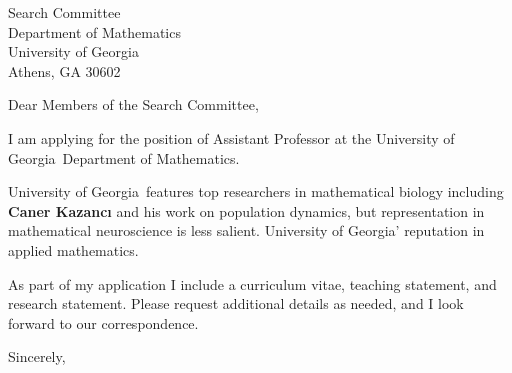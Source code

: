 \documentclass[11pt,a4paper]{letter}
\begin{document}

\def\School{University of Georgia}

\begin{letter}
{Search Committee\\
Department of Mathematics\\
University of Georgia\\
Athens, GA 30602}


\opening{Dear Members of the Search Committee,}

I am applying for the position of Assistant Professor at the \School~Department of Mathematics. 



\School~features top researchers in mathematical biology including \textbf{Caner Kazancı} and his work on population dynamics, but representation in mathematical neuroscience is less salient. \School' reputation in applied mathematics.



As part of my application I include a curriculum vitae, teaching statement, and research statement. Please request additional details as needed, and I look forward to our correspondence.

\closing{Sincerely,}
\end{letter}
\end{document}
